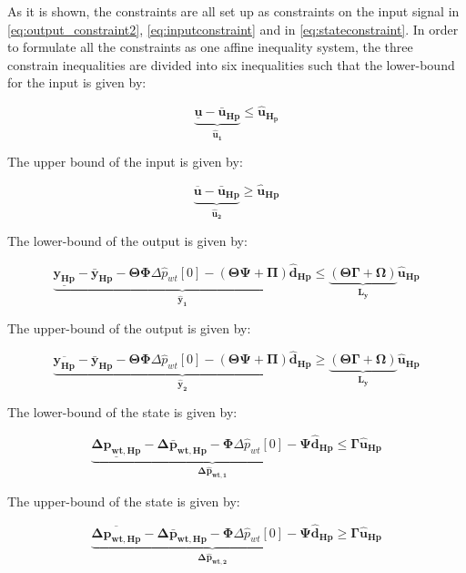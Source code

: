 As it is shown, the constraints are all set up as constraints on the input signal in \eqref{eq:output_constraint2}, \eqref{eq:inputconstraint} and in \eqref{eq:stateconstraint}. In order to formulate all the constraints as one affine inequality system, the three constrain inequalities are divided into six inequalities such that the lower-bound for the input is given by:


\begin{equation}
\underbrace{\underline{\bm{{u}}} - \bm{\bar{u}_{Hp}}}_{\bm{\hat{u}_{1}}} \leq \bm{\hat{u}_{H_p}}
\end{equation}


The upper bound of the input is given by:

\begin{equation}
	\underbrace{\overline{\bm{{u}}} - \bm{\bar{u}_{Hp}}}_{\bm{\hat{u}_{2}}} \geq \bm{\hat{u}_{Hp}}
\end{equation}

The lower-bound of the output is given by:

\begin{equation}
\underbrace{\underline{\bm{y_{Hp}}} - \bm{\bar{y}_{Hp}} - \bm{\Theta} \bm{\Phi} \Delta \hat{p}_{wt}[0] - (\bm{\Theta \Psi + \Pi}) \bm{\hat{d}_{Hp}}}_{\bm{\hat{y}_1}} \leq \underbrace{(\bm{\Theta \Gamma + \Omega})}_{\bm{L_y}} \bm{\hat{u}_{Hp}}
\end{equation}

The upper-bound of the output is given by:

\begin{equation}
\underbrace{\overline{\bm{y_{Hp}}} - \bm{\bar{y}_{Hp}} - \bm{\Theta} \bm{\Phi} \Delta \hat{p}_{wt}[0] - (\bm{\Theta \Psi + \Pi}) \bm{\hat{d}_{Hp}}}_{\bm{\hat{y}_2}} \geq \underbrace{(\bm{\Theta \Gamma + \Omega})}_{\bm{L_y}} \bm{\hat{u}_{Hp}}
\end{equation}

The lower-bound of the state is given by:

\begin{equation}
\underbrace{\underline{\bm{\Delta p_{wt,Hp}}} - \bm{\Delta \bar{p}_{wt,Hp}} -  \bm{\Phi} \Delta \hat{p}_{wt}[0] - \bm{\Psi} \bm{\hat{d}_{Hp}}}_{\bm{\Delta \hat{p}_{wt,1}}} \leq \bm{\Gamma} \bm{\hat{u}_{Hp}}
\end{equation}

The upper-bound of the state is given by:

\begin{equation}
\underbrace{\overline{\bm{\Delta p_{wt,Hp}}} - \bm{\Delta \bar{p}_{wt,Hp}} -  \bm{\Phi} \Delta \hat{p}_{wt}[0] - \bm{\Psi} \bm{\hat{d}_{Hp}}}_{\bm{\Delta \hat{p}_{wt,2}}} \geq \bm{\Gamma} \bm{\hat{u}_{Hp}}
\end{equation}

